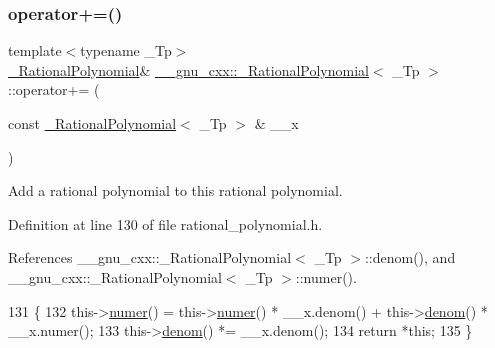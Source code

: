 \subsubsection{\texorpdfstring{operator+=()}{operator+=()}}
{\footnotesize\ttfamily template$<$typename \+\_\+\+Tp$>$ \\
\hyperlink{class____gnu__cxx_1_1__RationalPolynomial}{\+\_\+\+Rational\+Polynomial}\& \hyperlink{class____gnu__cxx_1_1__RationalPolynomial}{\+\_\+\+\_\+gnu\+\_\+cxx\+::\+\_\+\+Rational\+Polynomial}$<$ \+\_\+\+Tp $>$\+::operator+= (\begin{DoxyParamCaption}\item[{const \hyperlink{class____gnu__cxx_1_1__RationalPolynomial}{\+\_\+\+Rational\+Polynomial}$<$ \+\_\+\+Tp $>$ \&}]{\+\_\+\+\_\+x }\end{DoxyParamCaption})\hspace{0.3cm}{\ttfamily [inline]}}

Add a rational polynomial to this rational polynomial. 

Definition at line 130 of file rational\+\_\+polynomial.\+h.



References \+\_\+\+\_\+gnu\+\_\+cxx\+::\+\_\+\+Rational\+Polynomial$<$ \+\_\+\+Tp $>$\+::denom(), and \+\_\+\+\_\+gnu\+\_\+cxx\+::\+\_\+\+Rational\+Polynomial$<$ \+\_\+\+Tp $>$\+::numer().


\begin{DoxyCode}
131       \{
132         this->\hyperlink{class____gnu__cxx_1_1__RationalPolynomial_aa42ac2f6c2368cae05ba3a3cebf0fa24}{numer}() = this->\hyperlink{class____gnu__cxx_1_1__RationalPolynomial_aa42ac2f6c2368cae05ba3a3cebf0fa24}{numer}() * \_\_x.denom() + this->\hyperlink{class____gnu__cxx_1_1__RationalPolynomial_a05e84913ccfddcf6fcbfe623cb56c937}{denom}() * \_\_x.numer();
133         this->\hyperlink{class____gnu__cxx_1_1__RationalPolynomial_a05e84913ccfddcf6fcbfe623cb56c937}{denom}() *= \_\_x.denom();
134         \textcolor{keywordflow}{return} *\textcolor{keyword}{this};
135       \}
\end{DoxyCode}
\mbox{\label{class____gnu__cxx_1_1__RationalPolynomial_a21c445f37dbceb2832ab1eebf5d2d965}} 
